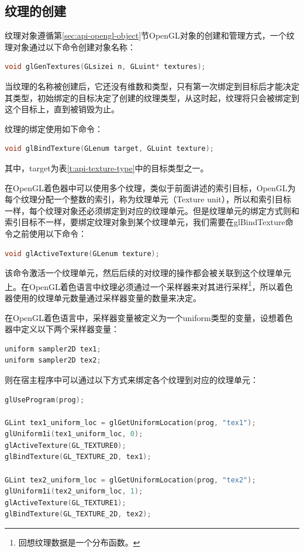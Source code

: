 \subsection{纹理的创建}\label{sec:api-texture-create}
纹理对象遵循第\ref{sec:api-opengl-object}节OpenGL对象的创建和管理方式，一个纹理对象通过以下命令创建对象名称：

\begin{lstlisting}[language=C++]
void glGenTextures(GLsizei n, GLuint* textures);
\end{lstlisting}

当纹理的名称被创建后，它还没有维数和类型，只有第一次绑定到目标后才能决定其类型，初始绑定的目标决定了创建的纹理类型，从这时起，纹理将只会被绑定到这个目标上，直到被销毁为止。

纹理的绑定使用如下命令：

\begin{lstlisting}[language=C++]
void glBindTexture(GLenum target, GLuint texture);
\end{lstlisting}

其中，target为表\ref{t:api-texture-type}中的目标类型之一。

在OpenGL着色器中可以使用多个纹理，类似于前面讲述的索引目标，OpenGL为每个纹理分配一个整数的索引，称为纹理单元（Texture unit），所以和索引目标一样，每个纹理对象还必须绑定到对应的纹理单元。但是纹理单元的绑定方式则和索引目标不一样，要绑定纹理对象到某个纹理单元，我们需要在glBindTexture命令之前使用以下命令：

\begin{lstlisting}[language=C++]
void glActiveTexture(GLenum texture);
\end{lstlisting}

该命令激活一个纹理单元，然后后续的对纹理的操作都会被关联到这个纹理单元上。在OpenGL着色语言中纹理必须通过一个采样器来对其进行采样\footnote{回想纹理数据是一个分布函数。}，所以着色器使用的纹理单元数量通过采样器变量的数量来决定。

在OpenGL着色语言中，采样器变量被定义为一个uniform类型的变量，设想着色器中定义以下两个采样器变量：

\begin{lstlisting}[language=C++]
uniform sampler2D tex1;
uniform sampler2D tex2;
\end{lstlisting}

则在宿主程序中可以通过以下方式来绑定各个纹理到对应的纹理单元：

\begin{lstlisting}[language=C++]
glUseProgram(prog);

GLint tex1_uniform_loc = glGetUniformLocation(prog, "tex1");
glUniform1i(tex1_uniform_loc, 0);
glActiveTexture(GL_TEXTURE0);
glBindTexture(GL_TEXTURE_2D, tex1);
 	
GLint tex2_uniform_loc = glGetUniformLocation(prog, "tex2");
glUniform1i(tex2_uniform_loc, 1);
glActiveTexture(GL_TEXTURE1);
glBindTexture(GL_TEXTURE_2D, tex2);
\end{lstlisting}

